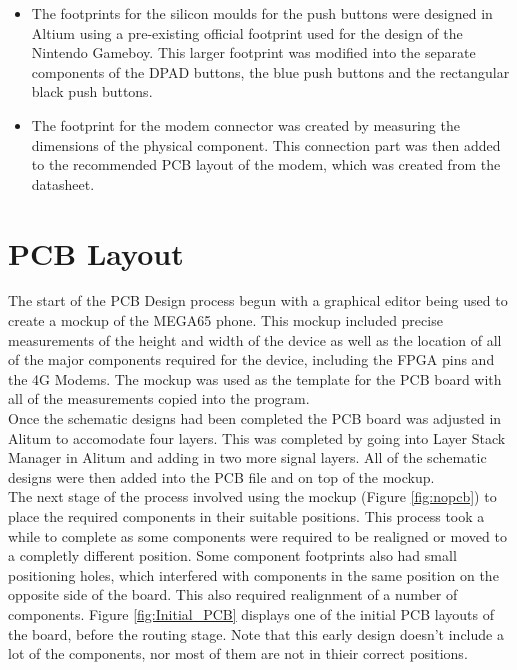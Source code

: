 \begin{itemize}
\item The footprints for the silicon moulds for the push buttons were designed in Altium using a pre-existing official footprint used for the design of the Nintendo Gameboy. 
This larger footprint was modified into the separate components of the DPAD buttons, the blue push buttons and the rectangular black push buttons.
\item The footprint for the modem connector was created by measuring the dimensions of the physical component. 
This connection part was then added to the recommended PCB layout of the modem, which was created from the datasheet. 
\end{itemize}


\section{PCB Layout}
\label{chap6sec5}

	The start of the PCB Design process begun with a graphical editor being used to create a mockup of the MEGA65 phone. 
This mockup included precise measurements of the height and width of the device as well as the location of all of the major components required for the device, including the FPGA pins and the 4G Modems. 
The mockup was used as the template for the PCB board with all of the measurements copied into the program. \\
	Once the schematic designs had been completed the PCB board was adjusted in Alitum to accomodate four layers. 
This was completed by going into Layer Stack Manager in Alitum and adding in two more signal layers. 
All of the schematic designs were then added into the PCB file and on top of the mockup. \\
The next stage of the process involved using the mockup (Figure \ref{fig:nopcb}) to place the required components in their suitable positions. 
This process took a while to complete as some components were required to be realigned or moved to a completly different position. 
Some component footprints also had small positioning holes, which interfered with components in the same position on the opposite side of the board. 
This also required realignment of a number of components. 
Figure \ref{fig:Initial_PCB} displays one of the initial PCB layouts of the board, before the routing stage. 
Note that this early design doesn't include a lot of the components, nor most of them are not in thieir correct positions.\\

